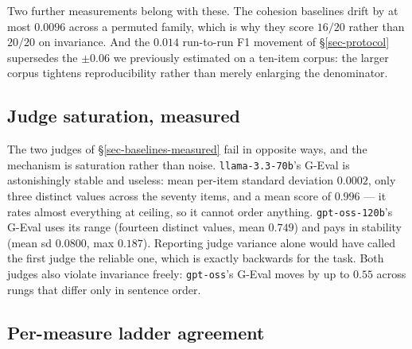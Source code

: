 Two further measurements belong with these. The cohesion baselines drift by at most $0.0096$ across a permuted
family, which is why they score $16/20$ rather than $20/20$ on invariance. And the $0.014$ run-to-run F1
movement of \S\ref{sec-protocol} supersedes the $\pm 0.06$ we previously estimated on a ten-item corpus: the
larger corpus tightens reproducibility rather than merely enlarging the denominator.

\subsection{Judge saturation, measured}
\label{app-judge-saturation}

The two judges of \S\ref{sec-baselines-measured} fail in opposite ways, and the mechanism is saturation rather
than noise. \texttt{llama-3.3-70b}'s G-Eval is astonishingly stable and useless: mean per-item standard
deviation $0.0002$, only three distinct values across the seventy items, and a mean score of $0.996$ --- it
rates almost everything at ceiling, so it cannot order anything. \texttt{gpt-oss-120b}'s G-Eval uses its range
(fourteen distinct values, mean $0.749$) and pays in stability (mean sd $0.0800$, max $0.187$). Reporting judge
variance alone would have called the first judge the reliable one, which is exactly backwards for the task.
Both judges also violate invariance freely: \texttt{gpt-oss}'s G-Eval moves by up to $0.55$ across rungs that
differ only in sentence order.

\subsection{Per-measure ladder agreement}

